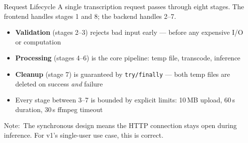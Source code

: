\documentclass{beamer}
\newcommand{\nt}{$\underline{\text{Note}}:$ }
\begin{document}
\begin{frame}{Request Lifecycle}
    A single transcription request passes through eight stages.
    The frontend handles stages 1 and 8; the backend handles 2--7.

    \vspace{0.6em}
    \begin{itemize}
        \item \textbf{Validation} (stages 2--3) rejects bad input early ---
              before any expensive I/O or computation
        \item \textbf{Processing} (stages 4--6) is the core pipeline:
              temp file, transcode, inference
        \item \textbf{Cleanup} (stage 7) is guaranteed by \texttt{try/finally}
              --- both temp files are deleted on success \textit{and} failure
        \item Every stage between 3--7 is bounded by explicit limits:
              10\,MB upload, 60\,s duration, 30\,s ffmpeg timeout
    \end{itemize}

    \vspace{0.4em}
    \nt The synchronous design means the HTTP connection stays open
    during inference. For v1's single-user use case, this is correct.
\end{frame}
\end{document}
